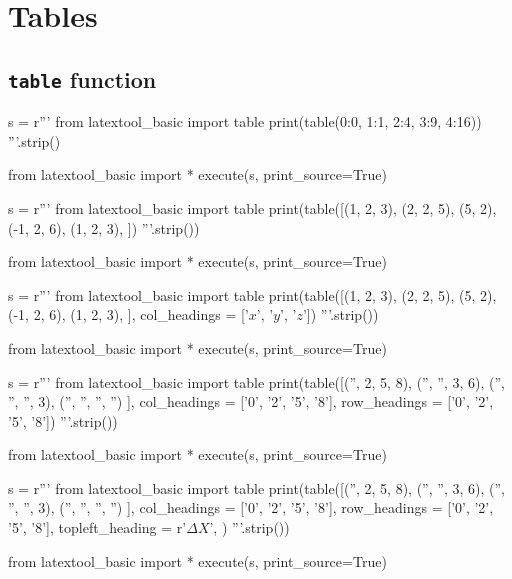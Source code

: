 \section{Tables}

\subsection{\texttt{table} function}

\begin{python}
s = r'''
from latextool_basic import table
print(table({0:0, 1:1, 2:4, 3:9, 4:16}))
'''.strip()

from latextool_basic import *
execute(s, print_source=True)
\end{python}


\begin{python}
s = r'''
from latextool_basic import table
print(table([(1, 2, 3),
             (2, 2, 5),
             (5, 2),
             (-1, 2, 6),
             (1, 2, 3),
            ])
'''.strip())

from latextool_basic import *
execute(s, print_source=True)
\end{python}


\begin{python}
s = r'''
from latextool_basic import table
print(table([(1, 2, 3),
             (2, 2, 5),
             (5, 2),
             (-1, 2, 6),
             (1, 2, 3),
            ],
            col_headings = ['$x$', '$y$', '$z$'])
'''.strip())

from latextool_basic import *
execute(s, print_source=True)
\end{python}


\begin{python}
s = r'''
from latextool_basic import table
print(table([('',  2, 5,  8),
             ('', '', 3,  6),
             ('', '', '', 3),
             ('', '', '', '')
            ],
            col_headings = ['0', '2', '5', '8'],
            row_headings = ['0', '2', '5', '8'])
'''.strip())

from latextool_basic import *
execute(s, print_source=True)
\end{python}


\begin{python}
s = r'''
from latextool_basic import table
print(table([('',  2, 5,  8),
             ('', '', 3,  6),
             ('', '', '', 3),
             ('', '', '', '')
            ],
            col_headings = ['0', '2', '5', '8'],
            row_headings = ['0', '2', '5', '8'],
            topleft_heading = r'$\Delta X$',
           )
'''.strip())

from latextool_basic import *
execute(s, print_source=True)
\end{python}

